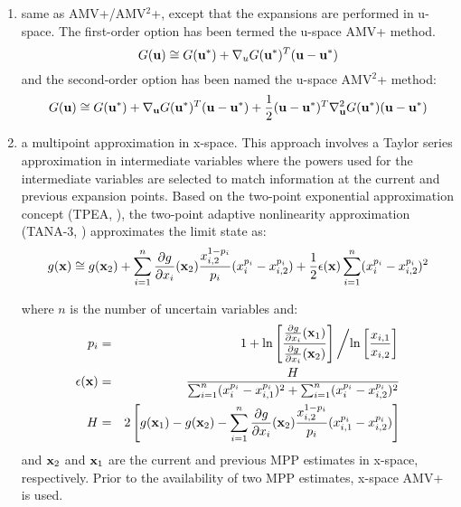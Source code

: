 \begin{enumerate}
\item same as AMV+/AMV$^2$+, except that the expansions are performed in 
u-space.  The first-order option has been termed the u-space AMV+ method.
\begin{equation}
G({\bf u}) \cong G({\bf u}^*) + \nabla_u G({\bf u}^*)^T ({\bf u} - {\bf u}^*)
\label{eq:linear_u_mpp}
\end{equation}
and the second-order option has been named the u-space AMV$^2$+ method:
\begin{equation}
G({\bf u}) \cong G({\bf u}^*) + \nabla_{\bf u} G({\bf u}^*)^T 
({\bf u} - {\bf u}^*) + \frac{1}{2} ({\bf u} - {\bf u}^*)^T 
\nabla^2_{\bf u} G({\bf u}^*) ({\bf u} - {\bf u}^*) \label{eq:taylor2_u_mpp}
\end{equation}

\item a multipoint approximation in x-space. This approach involves a 
Taylor series approximation in intermediate variables where the powers
used for the intermediate variables are selected to match information at
the current and previous expansion points.  Based on the 
two-point exponential approximation concept (TPEA, \cite{Fad90}), the 
two-point adaptive nonlinearity approximation (TANA-3, \cite{Xu98})
approximates the limit state as:
\begin{equation}
g({\bf x}) \cong g({\bf x}_2) + \sum_{i=1}^n 
\frac{\partial g}{\partial x_i}({\bf x}_2) \frac{x_{i,2}^{1-p_i}}{p_i} 
(x_i^{p_i} - x_{i,2}^{p_i}) + \frac{1}{2} \epsilon({\bf x}) \sum_{i=1}^n 
(x_i^{p_i} - x_{i,2}^{p_i})^2 \label{eq:tana_g}
\end{equation}

\noindent where $n$ is the number of uncertain variables and:
\begin{eqnarray}
p_i & = & 1 + \ln \left[ \frac{\frac{\partial g}{\partial x_i}({\bf x}_1)}
{\frac{\partial g}{\partial x_i}({\bf x}_2)} \right] \left/ 
\ln \left[ \frac{x_{i,1}}{x_{i,2}} \right] \right. \label{eq:tana_pi_x} \\
\epsilon({\bf x}) & = & \frac{H}{\sum_{i=1}^n (x_i^{p_i} - x_{i,1}^{p_i})^2 + 
\sum_{i=1}^n (x_i^{p_i} - x_{i,2}^{p_i})^2} \label{eq:tana_eps_x} \\
H & = & 2 \left[ g({\bf x}_1) - g({\bf x}_2) - \sum_{i=1}^n 
\frac{\partial g}{\partial x_i}({\bf x}_2) \frac{x_{i,2}^{1-p_i}}{p_i} 
(x_{i,1}^{p_i} - x_{i,2}^{p_i}) \right] \label{eq:tana_H_x}
\end{eqnarray}
\noindent and ${\bf x}_2$ and ${\bf x}_1$ are the current and previous
MPP estimates in x-space, respectively.  Prior to the availability of
two MPP estimates, x-space AMV+ is used.


\end{enumerate}
